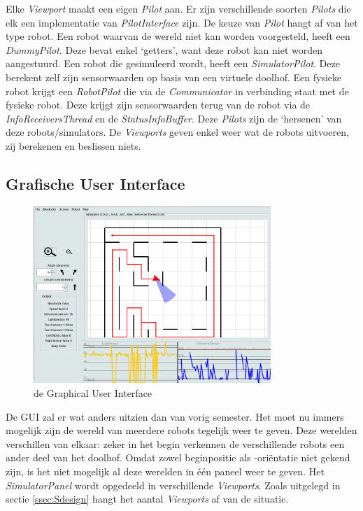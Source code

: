 \documentclass[tt1]{penoverslag}
\begin{document}
Elke \textit{Viewport} maakt een eigen \textit{Pilot} aan. Er zijn verschillende soorten \textit{Pilots} die elk een implementatie van \textit{PilotInterface} zijn. De keuze van \textit{Pilot} hangt af van het type robot. Een robot waarvan de wereld niet kan worden voorgesteld, heeft een \textit{DummyPilot}. Deze bevat enkel `getters', want deze robot kan niet worden aangestuurd. Een robot die gesimuleerd wordt, heeft een \textit{SimulatorPilot}. Deze berekent zelf zijn sensorwaarden op basis van een virtuele doolhof. Een fysieke robot krijgt een \textit{RobotPilot} die via de \textit{Communicator} in verbinding staat met de fysieke robot. Deze krijgt zijn sensorwaarden terug van de robot via de \textit{InfoReceiversThread} en de \textit{StatusInfoBuffer}. Deze \textit{Pilots} zijn de `hersenen' van deze robots/simulators. De \textit{Viewports} geven enkel weer wat de robots uitvoeren, zij berekenen en beslissen niets.

\subsection{Grafische User Interface}
\label{ssec:GUI}

\begin{figure}[hb]
\centering
	\includegraphics[width=0.8\textwidth]{GUI}
\caption{de Graphical User Interface}
\label{fig:GUI}
\end{figure}

De GUI zal er wat anders uitzien dan van vorig semester. Het moet nu immers mogelijk zijn de wereld van meerdere robots tegelijk weer te geven. Deze werelden verschillen van elkaar: zeker in het begin verkennen de verschillende robots een ander deel van het doolhof. Omdat zowel beginpositie als -ori\"entatie niet gekend zijn, is het niet mogelijk al deze werelden in \'e\'en paneel weer te geven. Het \textit{SimulatorPanel} wordt opgedeeld in verschillende \textit{Viewports}. Zoals uitgelegd in sectie \ref{ssec:Sdesign} hangt het aantal \textit{Viewports} af van de situatie.\\
\end{document}
